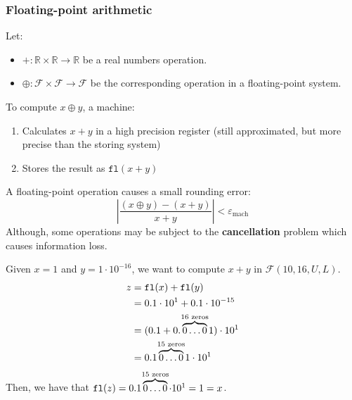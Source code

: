 \subsubsection{Floating-point arithmetic}
Let:
\begin{itemize}
    \item $+: \mathbb{R} \times \mathbb{R} \rightarrow \mathbb{R}$ be a real numbers operation.
    \item $\oplus: \mathcal{F} \times \mathcal{F} \rightarrow \mathcal{F}$ be the corresponding operation in a floating-point system.
\end{itemize}
%
To compute $x \oplus y$, a machine:
\begin{enumerate}
    \item Calculates $x + y$ in a high precision register (still approximated, but more precise than the storing system)
    \item Stores the result as $\texttt{fl}(x + y)$
\end{enumerate}

A floating-point operation causes a small rounding error:
\begin{equation}
    \left\vert \frac{(x \oplus y) - (x + y)}{x+y} \right\vert < \varepsilon_{\text{mach}}
\end{equation}
%
Although, some operations may be subject to the \textbf{cancellation} problem which causes information loss.
\begin{example}
    Given $x = 1$ and $y = 1 \cdot 10^{-16}$, we want to compute $x + y$ in $\mathcal{F}(10, 16, U, L)$.\\
    \begin{equation*}
        \begin{split}
            z & = \texttt{fl}(x) + \texttt{fl}(y) \\
              & = 0.1 \cdot 10^1 + 0.1 \cdot 10^{-15} \\
              & = (0.1 + 0.\overbrace{0\dots0}^{\mathclap{16\text{ zeros}}}1) \cdot 10^1 \\
              & = 0.1\overbrace{0\dots0}^{\mathclap{15\text{ zeros}}}1 \cdot 10^1
        \end{split}
    \end{equation*}
    Then, we have that $\texttt{fl}(z) = 0.1\overbrace{0\dots0}^{\mathclap{15\text{ zeros}}} \cdot 10^1 = 1 = x$.
\end{example}